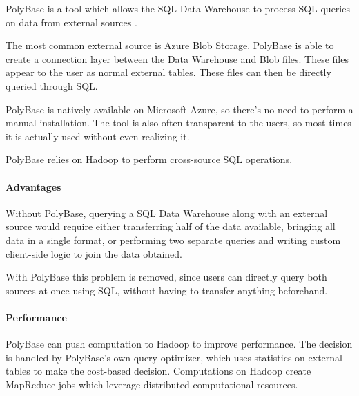 PolyBase is a tool which allows the SQL Data Warehouse to process SQL queries on data from external sources \cite{bib:azure:polybase}.

The most common external source is Azure Blob Storage.
PolyBase is able to create a connection layer between the Data Warehouse and Blob files.
These files appear to the user as normal external tables.
These files can then be directly queried through SQL.

PolyBase is natively available on Microsoft Azure, so there's no need to perform a manual installation.
The tool is also often transparent to the users, so most times it is actually used without even realizing it.

PolyBase relies on Hadoop to perform cross-source SQL operations.

\paragraph{Advantages}
    Without PolyBase, querying a SQL Data Warehouse along with an external source would require either transferring half of the data available, bringing all data in a single format, or performing two separate queries and writing custom client-side logic to join the data obtained.
    
    With PolyBase this problem is removed, since users can directly query both sources at once using SQL, without having to transfer anything beforehand.

\paragraph{Performance}
    PolyBase can push computation to Hadoop to improve performance.
    The decision is handled by PolyBase's own query optimizer, which uses statistics on external tables to make the cost-based decision.
    Computations on Hadoop create MapReduce jobs which leverage distributed computational resources.
